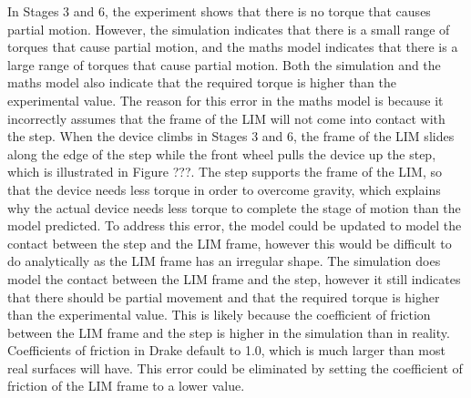 In Stages 3 and 6, the experiment shows that there is no torque that causes partial motion. However, the simulation indicates that there is a small range of torques that cause partial motion, and the maths model indicates that there is a large range of torques that cause partial motion. Both the simulation and the maths model also indicate that the required torque is higher than the experimental value. The reason for this error in the maths model is because it incorrectly assumes that the frame of the LIM will not come into contact with the step. When the device climbs in Stages 3 and 6, the frame of the LIM slides along the edge of the step while the front wheel pulls the device up the step, which is illustrated in Figure ???. The step supports the frame of the LIM, so that the device needs less torque in order to overcome gravity, which explains why the actual device needs less torque to complete the stage of motion than the model predicted. To address this error, the model could be updated to model the contact between the step and the LIM frame, however this would be difficult to do analytically as the LIM frame has an irregular shape. The simulation does model the contact between the LIM frame and the step, however it still indicates that there should be partial movement and that the required torque is higher than the experimental value. This is likely because the coefficient of friction between the LIM frame and the step is higher in the simulation than in reality. Coefficients of friction in Drake default to 1.0, which is much larger than most real surfaces will have. This error could be eliminated by setting the coefficient of friction of the LIM frame to a lower value. \\

